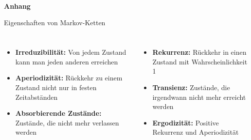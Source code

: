 \appendix
\begin{frame}
    \centering
    \vspace{2cm}
    {\Huge\textbf{Anhang}}
\end{frame}

\begin{frame}{Eigenschaften von Markov-Ketten}
    \begin{columns}
        \begin{itemize}[<+->]
            \item \textbf{Irreduzibilität:} Von jedem Zustand kann man jeden anderen erreichen
            \item \textbf{Aperiodizität:} Rückkehr zu einem Zustand nicht nur in festen Zeitabständen
            \item \textbf{Absorbierende Zustände:} Zustände, die nicht mehr verlassen werden
        \end{itemize}

        \begin{itemize}[<+->]
            \item \textbf{Rekurrenz:} Rückkehr in einen Zustand mit Wahrscheinlichkeit 1
            \item \textbf{Transienz:} Zustände, die irgendwann nicht mehr erreicht werden
            \item \textbf{Ergodizität:} Positive Rekurrenz und Aperiodizität
        \end{itemize}
    \end{columns}
\end{frame}

